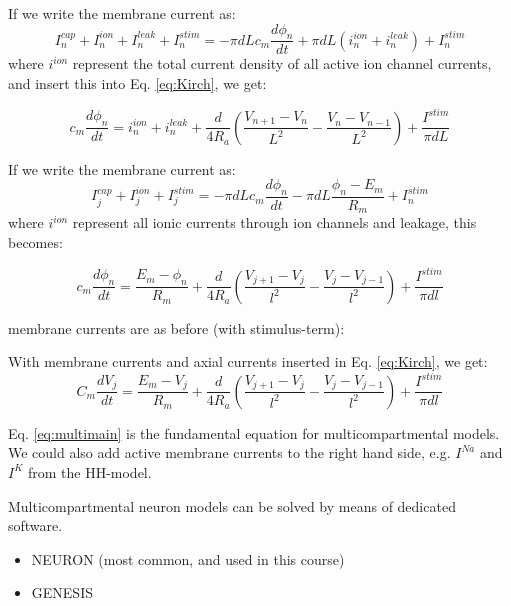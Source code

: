 If we write the membrane current as: 
\begin{equation}
I_n^{cap} + I_n^{ion} + I_n^{leak} + I_n^{stim} = -\pi d L c_m \frac{d\phi_n}{dt} + \pi d L (i_n^{ion} + i_n^{leak}) + I_n^{stim}
\label{eq:Imemb}
\end{equation}
where $i^{ion}$ represent the total current density of all active ion channel currents, and insert this into Eq. \ref{eq:Kirch}, we get:

\begin{equation}
c_m \frac{d\phi_n}{dt} = i_n^{ion} + i_n^{leak} + \frac{d}{4R_a}\left(\frac{V_{n+1}-V_n}{L^2} - \frac{V_n-V_{n-1}}{L^2} \right) + \frac{I^{stim}}{\pi d L}
\label{eq:multimain}
\end{equation}



If we write the membrane current as: 
\begin{equation}
I_j^{cap} + I_j^{ion} + I_j^{stim} = -\pi d L c_m \frac{d\phi_n}{dt} - \pi d L \frac{\phi_n-E_m}{R_m} + I_n^{stim}
\label{eq:Imemb}
\end{equation}
where $i^{ion}$ represent all ionic currents through ion channels and leakage, this becomes:

\begin{equation}
c_m \frac{d\phi_n}{dt} = \frac{E_m-\phi_n}{R_m} + \frac{d}{4R_a}\left(\frac{V_{j+1}-V_j}{l^2} - \frac{V_j-V_{j-1}}{l^2} \right) + \frac{I^{stim}}{\pi d l}
\label{eq:multimain}
\end{equation}




\item membrane currents are as before (with stimulus-term):

\item With membrane currents and axial currents inserted in Eq. \ref{eq:Kirch}, we get:
\begin{equation}
C_m \frac{dV_j}{dt} = \frac{E_m-V_j}{R_m} + \frac{d}{4R_a}\left(\frac{V_{j+1}-V_j}{l^2} - \frac{V_j-V_{j-1}}{l^2} \right) + \frac{I^{stim}}{\pi d l}
\label{eq:multimain}
\end{equation}

\item Eq. \ref{eq:multimain} is the fundamental equation for multicompartmental models. We could also add active membrane currents to the right hand side, e.g. $I^{Na}$ and $I^K$ from the HH-model.

\item Multicompartmental neuron models can be solved by means of dedicated software.
\begin{itemize}
\item NEURON (most common, and used in this course)
\item GENESIS
\end{itemize}

